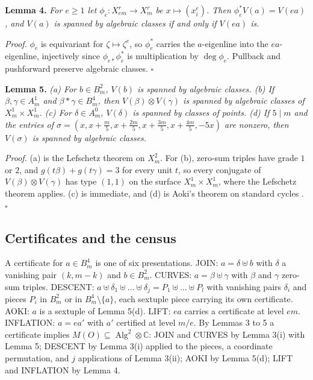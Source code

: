 \documentclass[10pt,twocolumn]{article}
\begin{document}
\textbf{Lemma 4.} \emph{For \(e\ge1\) let
\(\phi_e\colon X^r_{em}\to X^r_m\) be \(x\mapsto(x_i^e)\). Then
\(\phi_e^*V(a)=V(ea)\), and \(V(a)\) is spanned by algebraic classes if
and only if \(V(ea)\) is.}

\emph{Proof.} \(\phi_e\) is equivariant for \(\zeta\mapsto\zeta^e\), so
\(\phi_e^*\) carries the \(a\)-eigenline into the \(ea\)-eigenline,
injectively since \(\phi_{e*}\phi_e^*\) is multiplication by
\(\deg\phi_e\). Pullback and pushforward preserve algebraic classes.
\(\square\)

\textbf{Lemma 5.} \emph{(a) For \(b\in B^2_m\), \(V(b)\) is spanned by
algebraic classes. (b) If \(\beta,\gamma\in A^1_m\) and
\(\beta\ast\gamma\in B^4_m\), then \(V(\beta)\otimes V(\gamma)\) is
spanned by algebraic classes of \(X^1_m\times X^1_m\). (c) For
\(\delta\in A^0_m\), \(V(\delta)\) is spanned by classes of points. (d)
If \(5\mid m\) and the entries of
\(\sigma=(x,x+\tfrac m5,x+\tfrac{2m}5,x+\tfrac{3m}5,x+\tfrac{4m}5,-5x)\)
are nonzero, then \(V(\sigma)\) is spanned by algebraic classes.}

\emph{Proof.} (a) is the Lefschetz theorem on \(X^2_m\). For (b),
zero-sum triples have grade \(1\) or \(2\), and
\(g(t\beta)+g(t\gamma)=3\) for every unit \(t\), so every conjugate of
\(V(\beta)\otimes V(\gamma)\) has type \((1,1)\) on the surface
\(X^1_m\times X^1_m\), where the Lefschetz theorem applies. (c) is
immediate, and (d) is Aoki's theorem on standard cycles \cite{aoki1987}.
\(\square\)

\hypertarget{certificates-and-the-census}{%
\subsection{Certificates and the
census}\label{certificates-and-the-census}}

A certificate for \(a\in B^4_m\) is one of six presentations. JOIN:
\(a=\delta\uplus b\) with \(\delta\) a vanishing pair \((k,m-k)\) and
\(b\in B^2_m\). CURVES: \(a=\beta\uplus\gamma\) with \(\beta\) and
\(\gamma\) zero-sum triples. DESCENT:
\(a\uplus\delta_1\uplus\dots\uplus\delta_j=P_1\uplus\dots\uplus P_l\)
with vanishing pairs \(\delta_i\) and pieces \(P_i\) in \(B^2_m\) or in
\(B^4_m\setminus\{a\}\), each sextuple piece carrying its own
certificate. AOKI: \(a\) is a sextuple of Lemma 5(d). LIFT: \(ea\)
carries a certificate at level \(em\). INFLATION: \(a=ea'\) with \(a'\)
certified at level \(m/e\). By Lemmas 3 to 5 a certificate implies
\(M(O)\subseteq\operatorname{Alg}^2\otimes\mathbb{C}\): JOIN and CURVES
by Lemma 3(i) with Lemma 5; DESCENT by Lemma 3(i) applied to the pieces,
a coordinate permutation, and \(j\) applications of Lemma 3(ii); AOKI by
Lemma 5(d); LIFT and INFLATION by Lemma 4.
\end{document}
